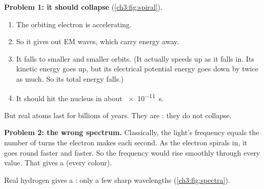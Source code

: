 \begin{sidebyside}[0.38]
  \centering
  \label{ch3:fig:spiral}
\nextside
  \textbf{Problem 1: it should collapse} (\cref{ch3:fig:spiral}).
  \begin{enumerate}
    \item The orbiting electron is accelerating.
    \item So it gives out EM waves, which carry energy away.
    \item It falls to smaller and smaller orbits. (It actually speeds up as it falls in.
          Its kinetic energy goes up, but its electrical potential energy goes down by twice
          as much. So its total energy falls.)
    \item It should hit the nucleus in about \qty{e-11}{s}.
  \end{enumerate}
  But real atoms last for billions of years. They are : they do not collapse.
\end{sidebyside}

\textbf{Problem 2: the wrong spectrum.} Classically, the light's frequency equals the number of
turns the electron makes each second. As the electron spirals in, it goes round faster and
faster. So the frequency would rise smoothly through every value. That gives a
 (every colour).

Real hydrogen gives a : only a few sharp wavelengths
(\cref{ch3:fig:spectra}).

